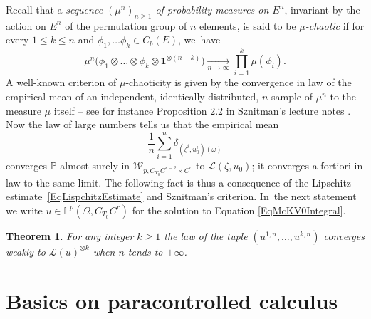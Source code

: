 \documentclass[10pt]{amsart}
\newtheorem{thm}{Theorem}
\theoremstyle{definition}
\newcommand{\bfone}{\mathbf{1}}
\newcommand{\mcL}{\mathcal{L}}
\newcommand\mcW{\mathcal W}
\newcommand{\bbL}{\mathbb{L}}
\begin{document}
Recall that a \textit{sequence $(\mu^n)_{n\geq 1}$ of probability measures on $E^n$}, invariant by the action on $E^n$ of the permutation group of $n$ elements, is said to be \textit{$\mu$-chaotic} if for every $1\leq k\leq n$ and $\phi_1,\dots\phi_k\in C_b(E)$, we~have
\[
\mu^n\bigl(\phi_1 \otimes \dots \otimes \phi_k \otimes \bfone^{\otimes (n-k)} \bigr) \underset{n\to\infty}{\to} \prod_{i=1}^k \mu(\phi_i).
\]
A well-known criterion of $\mu$-chaoticity is given by the convergence in law of the empirical mean of an independent, identically distributed, $n$-sample of $\mu^n$ to the measure $\mu$ itself -- see for instance Proposition 2.2 in Sznitman's lecture notes \cite{Snitzman89}. Now the law of large numbers tells us that the empirical mean
\[
\frac{1}{n}\sum_{i=1}^n \delta_{(\zeta^i,u_0^i)(\omega)}
\]
converges $\mathbb{P}$-almost surely in $\mcW_{p,C_{T_0}C^{r-2}\times C^r}$ to $\mcL(\zeta,u_0)$; it converges a fortiori in law to the same limit. The following fact is thus a consequence of the Lipschitz estimate~\eqref{EqLispchitzEstimate} and Sznitman's criterion. In~the next statement we write $u\in \bbL^p(\Omega, C_{T_0}C^r)$ for the solution to Equation \eqref{EqMcKV0Integral}.

\begin{thm}
For any integer $k\geq 1$ the law of the tuple $(u^{1,n},\dots, u^{k,n})$ converges weakly to $\mcL(u)^{\otimes k}$ when $n $ tends to $+\infty$.
\end{thm}

\section{Basics on paracontrolled calculus}
\label{SectionBasics}
\end{document}
